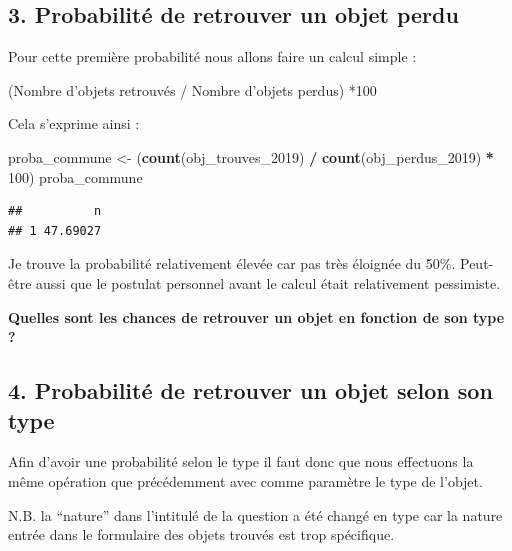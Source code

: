 \documentclass[
]{article}
\newenvironment{Shaded}{\begin{snugshade}}{\end{snugshade}}
\newcommand{\DecValTok}[1]{\textcolor[rgb]{0.00,0.00,0.81}{#1}}
\newcommand{\FunctionTok}[1]{\textcolor[rgb]{0.13,0.29,0.53}{\textbf{#1}}}
\newcommand{\NormalTok}[1]{#1}
\newcommand{\OtherTok}[1]{\textcolor[rgb]{0.56,0.35,0.01}{#1}}
\newcommand{\SpecialCharTok}[1]{\textcolor[rgb]{0.81,0.36,0.00}{\textbf{#1}}}
\begin{document}
\hypertarget{probabilituxe9-de-retrouver-un-objet-perdu}{%
\subsection{3. Probabilité de retrouver un objet
perdu}\label{probabilituxe9-de-retrouver-un-objet-perdu}}

Pour cette première probabilité nous allons faire un calcul simple :

(Nombre d'objets retrouvés / Nombre d'objets perdus) *100

Cela s'exprime ainsi :

\begin{Shaded}
\begin{Highlighting}[]
\NormalTok{proba\_commune }\OtherTok{\textless{}{-}}\NormalTok{ (}\FunctionTok{count}\NormalTok{(obj\_trouves\_2019) }\SpecialCharTok{/} \FunctionTok{count}\NormalTok{(obj\_perdus\_2019) }\SpecialCharTok{*} \DecValTok{100}\NormalTok{)}
\NormalTok{proba\_commune}
\end{Highlighting}
\end{Shaded}

\begin{verbatim}
##          n
## 1 47.69027
\end{verbatim}

Je trouve la probabilité relativement élevée car pas très éloignée du
50\%. Peut-être aussi que le postulat personnel avant le calcul était
relativement pessimiste.

\textbf{Quelles sont les chances de retrouver un objet en fonction de
son type ?}

\hypertarget{probabilituxe9-de-retrouver-un-objet-selon-son-type}{%
\subsection{4. Probabilité de retrouver un objet selon son
type}\label{probabilituxe9-de-retrouver-un-objet-selon-son-type}}

Afin d'avoir une probabilité selon le type il faut donc que nous
effectuons la même opération que précédemment avec comme paramètre le
type de l'objet.

N.B. la ``nature'' dans l'intitulé de la question a été changé en type
car la nature entrée dans le formulaire des objets trouvés est trop
spécifique.
\end{document}
